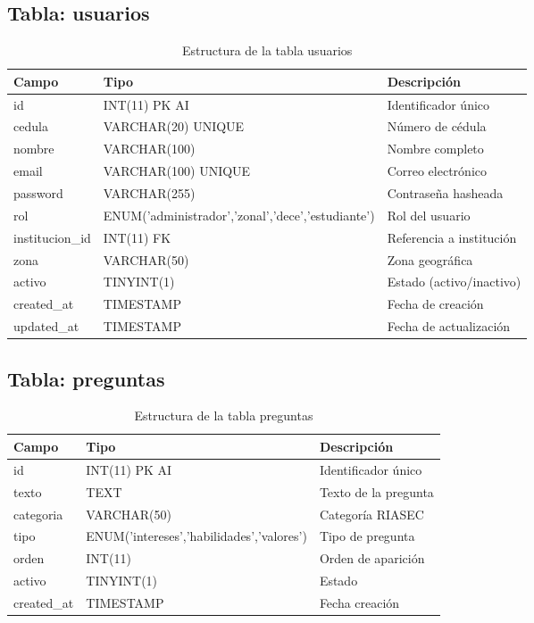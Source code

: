 \documentclass[12pt, a4paper]{report}
\begin{document}
\subsection{Tabla: usuarios}
\begin{table}[H]
\centering
\begin{tabularx}{\textwidth}{|l|X|l|}
\hline
\textbf{Campo} & \textbf{Tipo} & \textbf{Descripción} \\
\hline
id & INT(11) PK AI & Identificador único \\
cedula & VARCHAR(20) UNIQUE & Número de cédula \\
nombre & VARCHAR(100) & Nombre completo \\
email & VARCHAR(100) UNIQUE & Correo electrónico \\
password & VARCHAR(255) & Contraseña hasheada \\
rol & ENUM('administrador','zonal','dece','estudiante') & Rol del usuario \\
institucion\_id & INT(11) FK & Referencia a institución \\
zona & VARCHAR(50) & Zona geográfica \\
activo & TINYINT(1) & Estado (activo/inactivo) \\
created\_at & TIMESTAMP & Fecha de creación \\
updated\_at & TIMESTAMP & Fecha de actualización \\
\hline
\end{tabularx}
\caption{Estructura de la tabla usuarios}
\end{table}

\subsection{Tabla: preguntas}
\begin{table}[H]
\centering
\begin{tabularx}{\textwidth}{|l|X|l|}
\hline
\textbf{Campo} & \textbf{Tipo} & \textbf{Descripción} \\
\hline
id & INT(11) PK AI & Identificador único \\
texto & TEXT & Texto de la pregunta \\
categoria & VARCHAR(50) & Categoría RIASEC \\
tipo & ENUM('intereses','habilidades','valores') & Tipo de pregunta \\
orden & INT(11) & Orden de aparición \\
activo & TINYINT(1) & Estado \\
created\_at & TIMESTAMP & Fecha creación \\
\hline
\end{tabularx}
\caption{Estructura de la tabla preguntas}
\end{table}
\end{document}
